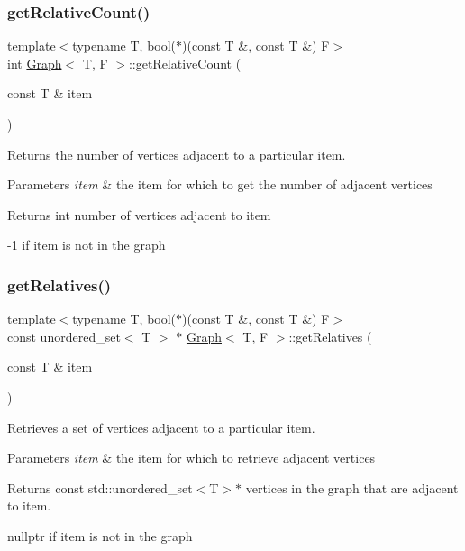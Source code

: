 \subsubsection{\texorpdfstring{get\+Relative\+Count()}{getRelativeCount()}}
{\footnotesize\ttfamily template$<$typename T, bool($\ast$)(const T \&, const T \&) F$>$ \\
int \hyperlink{class_graph}{Graph}$<$ T, F $>$\+::get\+Relative\+Count (\begin{DoxyParamCaption}\item[{const T \&}]{item }\end{DoxyParamCaption})}



Returns the number of vertices adjacent to a particular item. 


\begin{DoxyParams}{Parameters}
{\em item} & the item for which to get the number of adjacent vertices \\
\hline
\end{DoxyParams}
\begin{DoxyReturn}{Returns}
int number of vertices adjacent to item 

-\/1 if item is not in the graph 
\end{DoxyReturn}
\mbox{\label{class_graph_add90c1bc37771d0bf57515fd30d4c6c4}} 
\subsubsection{\texorpdfstring{get\+Relatives()}{getRelatives()}}
{\footnotesize\ttfamily template$<$typename T, bool($\ast$)(const T \&, const T \&) F$>$ \\
const unordered\+\_\+set$<$ T $>$ $\ast$ \hyperlink{class_graph}{Graph}$<$ T, F $>$\+::get\+Relatives (\begin{DoxyParamCaption}\item[{const T \&}]{item }\end{DoxyParamCaption})}



Retrieves a set of vertices adjacent to a particular item. 


\begin{DoxyParams}{Parameters}
{\em item} & the item for which to retrieve adjacent vertices \\
\hline
\end{DoxyParams}
\begin{DoxyReturn}{Returns}
const std\+::unordered\+\_\+set$<$\+T$>$$\ast$ vertices in the graph that are adjacent to item. 

nullptr if item is not in the graph 
\end{DoxyReturn}
\mbox{\label{class_graph_a30e9323548d265416291e975cfed93db}} 
